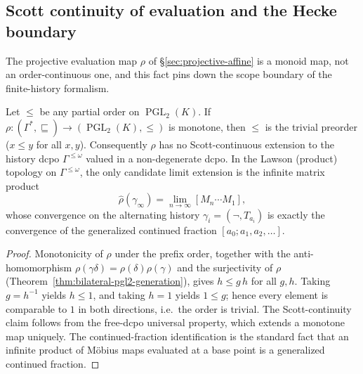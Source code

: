 \subsection{Scott continuity of evaluation and the Hecke boundary}

The projective evaluation map $\rho$ of \S\ref{sec:projective-affine} is a
monoid map, not an order-continuous one, and this fact pins down the scope
boundary of the finite-history formalism.

\begin{theorem}
\label{thm:rho-monotonicity-obstruction}
Let $\le$ be any partial order on $\operatorname{PGL}_2(K)$.  If
$\rho:(\Gamma^*,\sqsubseteq)\to(\operatorname{PGL}_2(K),\le)$ is monotone, then
$\le$ is the trivial preorder ($x\le y$ for all $x,y$).  Consequently $\rho$
has no Scott-continuous extension to the history dcpo $\Gamma^{\le\omega}$
valued in a non-degenerate dcpo.  In the Lawson (product) topology on
$\Gamma^{\le\omega}$, the only candidate limit extension is the infinite matrix
product
\[
\hat\rho(\gamma_\infty)=\lim_{n\to\infty}[M_n\cdots M_1],
\]
whose convergence on the alternating history $\gamma_i=(\neg,T_{a_i})$ is exactly
the convergence of the generalized continued fraction $[a_0;a_1,a_2,\dots]$.
\end{theorem}

\begin{proof}
Monotonicity of $\rho$ under the prefix order, together with the
anti-homomorphism $\rho(\gamma\delta)=\rho(\delta)\rho(\gamma)$ and the
surjectivity of $\rho$ (Theorem~\ref{thm:bilateral-pgl2-generation}), gives
$h\le g\,h$ for all $g,h$.  Taking $g=h^{-1}$ yields $h\le 1$, and taking
$h=1$ yields $1\le g$; hence every element is comparable to $1$ in both
directions, i.e.\ the order is trivial.  The Scott-continuity claim follows from
the free-dcpo universal property, which extends a monotone map uniquely.  The
continued-fraction identification is the standard fact that an infinite product
of M\"obius maps evaluated at a base point is a generalized continued fraction.
\end{proof}

